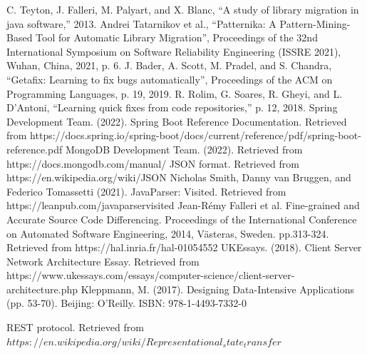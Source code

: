 \documentclass[letterpaper, 10 pt, conference]{ieeeconf}  %
\begin{document}
\begin{thebibliography}{99}
 C. Teyton, J. Falleri, M. Palyart, and X. Blanc, “A study of
library migration in java software,” 2013.
 Andrei Tatarnikov et al., “Patternika: A
Pattern-Mining-Based Tool for Automatic Library Migration”,
Proceedings of the 32nd International Symposium on Software
Reliability Engineering (ISSRE 2021), Wuhan, China, 2021, p. 6.
 J. Bader, A. Scott, M. Pradel, and S. Chandra, “Getafix:
Learning to fix bugs automatically”, Proceedings of the ACM on Programming
Languages, p. 19, 2019.
 R. Rolim, G. Soares, R. Gheyi, and L. D’Antoni, “Learning
quick fixes from code repositories,” p. 12, 2018.
 Spring Development Team. (2022). Spring Boot Reference
Documentation. Retrieved from
https://docs.spring.io/spring-boot/docs/current/reference/pdf/spring-boot-reference.pdf
 MongoDB Development Team. (2022). Retrieved from
https://docs.mongodb.com/manual/
 JSON format. Retrieved from https://en.wikipedia.org/wiki/JSON
 Nicholas Smith, Danny van Bruggen, and Federico Tomassetti
(2021). JavaParser: Visited. Retrieved from
https://leanpub.com/javaparservisited
 Jean-Rémy Falleri et al. Fine-grained and Accurate Source Code
Differencing. Proceedings of the International Conference on Automated
Software Engineering, 2014, Västeras, Sweden. pp.313-324. Retrieved from
https://hal.inria.fr/hal-01054552
 UKEssays. (2018). Client Server Network Architecture Essay.
Retrieved from https://www.ukessays.com/essays/computer-science/client-server-architecture.php
 Kleppmann, M. (2017). Designing Data-Intensive Applications (pp.
53-70). Beijing: O'Reilly. ISBN: 978-1-4493-7332-0
\end{thebibliography}
 REST protocol. Retrieved from
$https://en.wikipedia.org/wiki/Representational_state_transfer$
\end{document}
